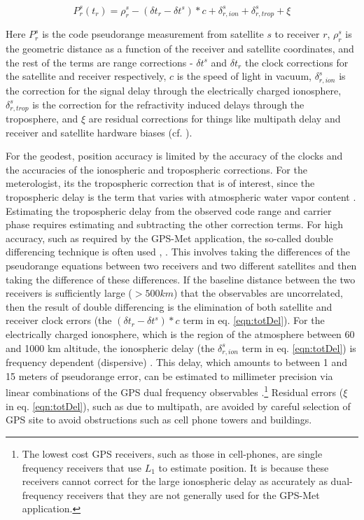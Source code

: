 \documentclass[proposal]{umassthesis}
\begin{document}
\begin{equation}
P_r^s(t_{r})  = \rho_r^s - (\delta t_r - \delta t^s) * c +  \delta_{r,ion}^s + \delta_{r,trop}^s + \xi
\label{eqn:totDel}
\end{equation}

Here $P_r^s$ is the code pseudorange measurement from satellite $s$ to receiver $r$, $\rho_r^s$ is the geometric distance as a function of the receiver and satellite coordinates, and the rest of the terms are range corrections - $\delta t^s$ and $\delta t_r$ the clock corrections for the satellite and receiver respectively, $c$ is the speed of light in vacuum, $\delta_{r,ion}^s$ is the correction for the signal delay through the electrically charged ionosphere, $\delta_{r,trop}^s$ is the correction for the refractivity induced delays through the troposphere, and $\xi$ are residual corrections for things like multipath delay and receiver and satellite hardware biases (cf. \cite{ming2014}).

For the geodest, position accuracy is limited by the accuracy of the clocks and the accuracies of the ionospheric and tropospheric corrections. For the meterologist, its the tropospheric correction that is of interest, since the tropospheric delay is the term that varies with atmospheric water vapor content \cite{bevis1992gps} \cite{rocken1995gps} \cite{duan1996gps}. Estimating the tropospheric delay from the observed code range and carrier phase requires estimating and subtracting the other correction terms. For high accuracy, such as required by the GPS-Met application, the so-called double differencing technique is often used \cite{remondi1984using}, \cite{alber2000obtaining}. This involves taking the differences of the pseudorange equations between two receivers and two different satellites and then taking the difference of these differences. If the baseline distance between the two receivers is sufficiently large ($> 500 km$) that the observables are uncorrelated, then the result of double differencing is the elimination of both satellite and receiver clock errors (the $(\delta t_r - \delta t^s) * c$ term in eq. \ref{eqn:totDel}). For the electrically charged ionosphere, which is the region of the atmosphere between 60 and 1000 km altitude, the ionospheric delay (the $\delta_{r,ion}^s$ term in eq. \ref{eqn:totDel}) is frequency dependent (dispersive) \cite{spilker1980gps}. This delay, which amounts to between 1 and 15 meters of pseudorange error, can be estimated to millimeter precision via linear combinations of the GPS dual frequency observables \cite{rocken1995gps}.\footnote{The lowest cost GPS receivers, such as those in cell-phones, are single frequency receivers that use $L_1$ to estimate position. It is because these receivers cannot correct for the large ionospheric delay as accurately as dual-frequency receivers that they are not generally used for the GPS-Met application.} Residual errors ($\xi$ in eq. \ref{eqn:totDel}), such as due to multipath, are avoided by careful selection of GPS site to avoid obstructions such as cell phone towers and buildings.
\end{document}

